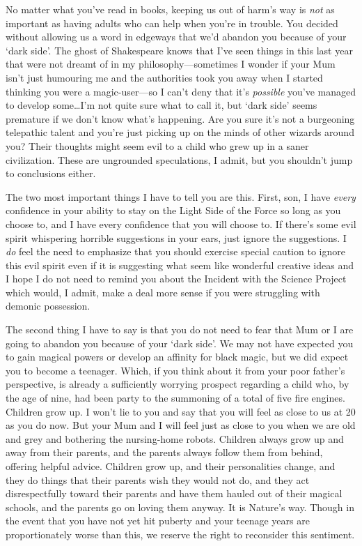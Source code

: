 \begin{writtenNote}

No matter what you’ve read in books, keeping us out of harm’s way is \emph{not} as important as having adults who can help when you’re in trouble. You decided without allowing us a word in edgeways that we’d abandon you because of your ‘dark side’. The ghost of Shakespeare knows that I’ve seen things in this last year that were not dreamt of in my philosophy—sometimes I wonder if your Mum isn’t just humouring me and the authorities took you away when I started thinking you were a magic-user—so I can’t deny that it’s \emph{possible} you’ve managed to develop some…I’m not quite sure what to call it, but ‘dark side’ seems premature if we don’t know what’s happening. Are you sure it’s not a burgeoning telepathic talent and you’re just picking up on the minds of other wizards around you? Their thoughts might seem evil to a child who grew up in a saner civilization. These are ungrounded speculations, I admit, but you shouldn’t jump to conclusions either.

The two most important things I have to tell you are this. First, son, I have \emph{every} confidence in your ability to stay on the Light Side of the Force so long as you choose to, and I have every confidence that you will choose to. If there’s some evil spirit whispering horrible suggestions in your ears, just ignore the suggestions. I \emph{do} feel the need to emphasize that you should exercise special caution to ignore this evil spirit even if it is suggesting what seem like wonderful creative ideas and I hope I do not need to remind you about the Incident with the Science Project which would, I admit, make a deal more sense if you were struggling with demonic possession.

The second thing I have to say is that you do not need to fear that Mum or I are going to abandon you because of your ‘dark side’. We may not have expected you to gain magical powers or develop an affinity for black magic, but we did expect you to become a teenager. Which, if you think about it from your poor father’s perspective, is already a sufficiently worrying prospect regarding a child who, by the age of nine, had been party to the summoning of a total of five fire engines. Children grow up. I won’t lie to you and say that you will feel as close to us at 20 as you do now. But your Mum and I will feel just as close to you when we are old and grey and bothering the nursing-home robots. Children always grow up and away from their parents, and the parents always follow them from behind, offering helpful advice. Children grow up, and their personalities change, and they do things that their parents wish they would not do, and they act disrespectfully toward their parents and have them hauled out of their magical schools, and the parents go on loving them anyway. It is Nature’s way. Though in the event that you have not yet hit puberty and your teenage years are proportionately worse than this, we reserve the right to reconsider this sentiment.


\end{writtenNote}
